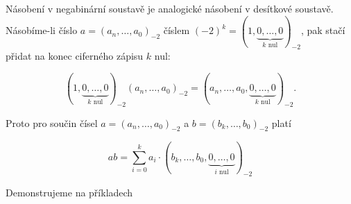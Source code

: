 \documentclass[12pt]{book}
\begin{document}
Násobení v negabinární soustavě je analogické násobení v desítkové soustavě. Násobíme-li číslo $a = (a_n, \dots, a_0)_{-2}$ číslem $(-2)^k = (1, \underbrace{0, \dots, 0}_{k\text{ nul}})_{-2}$, pak stačí přidat na konec ciferného zápisu $k$ nul:

$$(1, \underbrace{0, \dots, 0}_{k\text{ nul}})_{-2}(a_n, \dots, a_0)_{-2} = (a_n, \dots, a_0, \underbrace{0, \dots, 0}_{k\text{ nul}})_{-2}.$$

Proto pro součin čísel $a = (a_n, \dots, a_0)_{-2}$ a $b = (b_k, \dots, b_0)_{-2}$ platí

\begin{equation}\label{NBnase1}
  ab = \sum_{i=0}^{k} a_i\cdot(b_k, \dots, b_0, \underbrace{0, \dots, 0}_{i\text{ nul}} )_{-2}
\end{equation}

Demonstrujeme na příkladech
\end{document}
